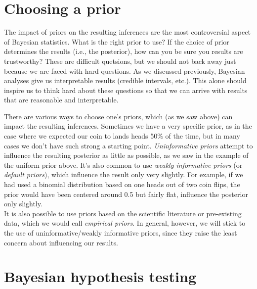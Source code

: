 \documentclass[12pt,]{book}
\theoremstyle{definition}
\theoremstyle{definition}
\theoremstyle{definition}
\theoremstyle{remark}
\begin{document}
\hypertarget{choosing-a-prior}{%
\section{Choosing a prior}\label{choosing-a-prior}}

The impact of priors on the resulting inferences are the most controversial aspect of Bayesian statistics. What is the right prior to use? If the choice of prior determines the results (i.e., the posterior), how can you be sure you results are trustworthy? These are difficult quetsions, but we should not back away just because we are faced with hard questions. As we discussed previously, Bayesian analyses give us interpretable results (credible intervals, etc.). This alone should inspire us to think hard about these questions so that we can arrive with results that are reasonable and interpretable.

There are various ways to choose one's priors, which (as we saw above) can impact the resulting inferences. Sometimes we have a very specific prior, as in the case where we expected our coin to lands heads 50\% of the time, but in many cases we don't have such strong a starting point. \emph{Uninformative priors} attempt to influence the resulting posterior as little as possible, as we saw in the example of the uniform prior above. It's also common to use \emph{weakly informative priors} (or \emph{default priors}), which influence the result only very slightly. For example, if we had used a binomial distribution based on one heads out of two coin flips, the prior would have been centered around 0.5 but fairly flat, influence the posterior only slightly.\\
It is also possible to use priors based on the scientific literature or pre-existing data, which we would call \emph{empirical priors}. In general, however, we will stick to the use of uninformative/weakly informative priors, since they raise the least concern about influencing our results.

\hypertarget{bayesian-hypothesis-testing}{%
\section{Bayesian hypothesis testing}\label{bayesian-hypothesis-testing}}
\end{document}
